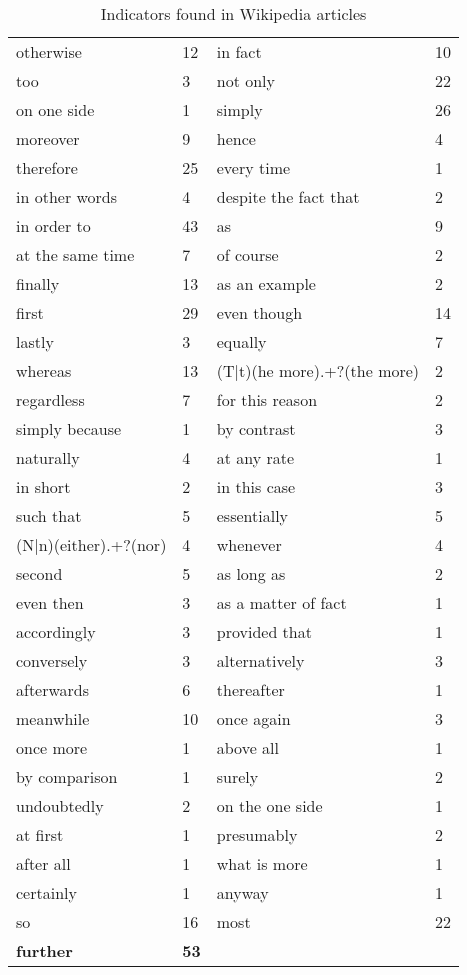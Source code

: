 \begin{table}[H]
{\begin{tabular}{ |p{4cm}|p{1cm}|p{5cm}|p{1cm}| }
				otherwise			&12				&in fact					&10				\\
				too					&3				&not only					&22				\\
				on one side			&1				&simply						&26 			\\
				moreover			&9				&hence						&4				\\
				therefore			&25				&every time					&1				\\
				in other words		&4				&despite the fact that		&2				\\
				in order to			&43				&as							&9				\\
				at the same time	&7				&of course					&2				\\
				finally				&13				&as an example				&2				\\
				first				&29				&even though				&14				\\
				lastly				&3				&equally					&7				\\
				whereas				&13				&(T|t)(he more).+?(the more)&2				\\
				regardless			&7				&for this reason			&2				\\
				simply because		&1				&by contrast				&3				\\
				naturally			&4				&at any rate				&1				\\
				in short			&2				&in this case				&3				\\
				such that			&5				&essentially				&5				\\
				(N|n)(either).+?(nor)&4				&whenever					&4				\\
				second				&5				&as long as					&2				\\
				even then			&3				&as a matter of fact		&1				\\
				accordingly			&3				&provided that				&1				\\
				conversely			&3				&alternatively				&3				\\
				afterwards			&6				&thereafter					&1				\\
				meanwhile			&10				&once again					&3				\\
				once more			&1				&above all					&1				\\
				by comparison		&1				&surely						&2 				\\
				undoubtedly			&2				&on the one side			&1				\\
				at first			&1				&presumably					&2				\\
				after all			&1				&what is more				&1				\\
				certainly			&1				&anyway						&1				\\
				so					&16				&most						&22				\\
				\textbf{further}	&\textbf{53}	&							&				\\
	   		\hline
			\end{tabular}}
	\caption{Indicators found in Wikipedia articles} 
	\label{indicators}
\end{table}

